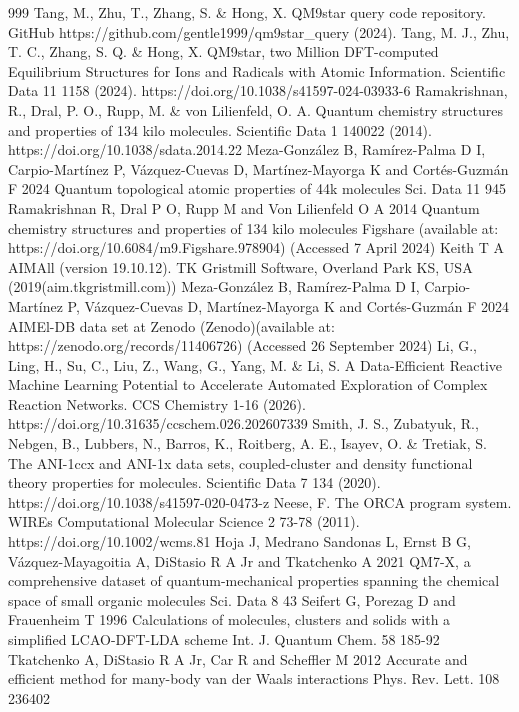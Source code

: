 \documentclass[12pt]{article}
\begin{document}
\begin{thebibliography}{999}
 Tang, M., Zhu, T., Zhang, S. \& Hong, X. QM9star query code repository. GitHub https://github.com/gentle1999/qm9star\_query (2024).
 Tang, M. J., Zhu, T. C., Zhang, S. Q. \& Hong, X. QM9star, two Million DFT-computed Equilibrium Structures for Ions and Radicals with Atomic Information. Scientific Data 11 1158 (2024). https://doi.org/10.1038/s41597-024-03933-6
 Ramakrishnan, R., Dral, P. O., Rupp, M. \& von Lilienfeld, O. A. Quantum chemistry structures and properties of 134 kilo molecules. Scientific Data 1 140022 (2014). https://doi.org/10.1038/sdata.2014.22
 Meza-González B, Ramírez-Palma D I, Carpio-Martínez P, Vázquez-Cuevas D, Martínez-Mayorga K and Cortés-Guzmán F 2024 Quantum topological atomic properties of 44k molecules Sci. Data 11 945
 Ramakrishnan R, Dral P O, Rupp M and Von Lilienfeld O A 2014 Quantum chemistry structures and properties of 134 kilo molecules Figshare (available at: https://doi.org/10.6084/m9.Figshare.978904) (Accessed 7 April 2024)
 Keith T A AIMAll (version 19.10.12). TK Gristmill Software, Overland Park KS, USA (2019(aim.tkgristmill.com))
 Meza-González B, Ramírez-Palma D I, Carpio-Martínez P, Vázquez-Cuevas D, Martínez-Mayorga K and Cortés-Guzmán F 2024 AIMEl-DB data set at Zenodo (Zenodo)(available at: https://zenodo.org/records/11406726) (Accessed 26 September 2024)
 Li, G., Ling, H., Su, C., Liu, Z., Wang, G., Yang, M. \& Li, S. A Data-Efficient Reactive Machine Learning Potential to Accelerate Automated Exploration of Complex Reaction Networks. CCS Chemistry 1-16 (2026). https://doi.org/10.31635/ccschem.026.202607339
 Smith, J. S., Zubatyuk, R., Nebgen, B., Lubbers, N., Barros, K., Roitberg, A. E., Isayev, O. \& Tretiak, S. The ANI-1ccx and ANI-1x data sets, coupled-cluster and density functional theory properties for molecules. Scientific Data 7 134 (2020). https://doi.org/10.1038/s41597-020-0473-z
 Neese, F. The ORCA program system. WIREs Computational Molecular Science 2 73-78 (2011). https://doi.org/10.1002/wcms.81
 Hoja J, Medrano Sandonas L, Ernst B G, Vázquez-Mayagoitia A, DiStasio R A Jr and Tkatchenko A 2021 QM7-X, a comprehensive dataset of quantum-mechanical properties spanning the chemical space of small organic molecules Sci. Data 8 43
 Seifert G, Porezag D and Frauenheim T 1996 Calculations of molecules, clusters and solids with a simplified LCAO-DFT-LDA scheme Int. J. Quantum Chem. 58 185-92
 Tkatchenko A, DiStasio R A Jr, Car R and Scheffler M 2012 Accurate and efficient method for many-body van der Waals interactions Phys. Rev. Lett. 108 236402

\end{thebibliography}
\end{document}
